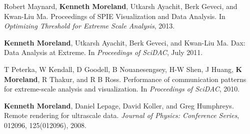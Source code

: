 \begin{enumerate}[label={[\arabic*]}, left=0pt]
\item  %
  Robert Maynard, \textbf{Kenneth Moreland}, Utkarsh Ayachit, Berk Geveci, and Kwan-Liu Ma.
  Proceedings of SPIE Visualization and Data Analysis.
  In \emph{Optimizing Threshold for Extreme Scale Analysis}, 2013.
\item  %
  \textbf{Kenneth Moreland}, Utkarsh Ayachit, Berk Geveci, and Kwan-Liu Ma.
  Dax: Data Analysis at Extreme.
  In \emph{Proceedings of SciDAC}, July 2011.
\item  %
  T Peterka, W Kendall, D Goodell, B Nouanesengsey, H-W Shen, J Huang, \textbf{K Moreland}, R Thakur, and R B Ross.
  Performance of communication patterns for extreme-scale analysis and visualization.
  In \emph{Proceedings of SciDAC}, 2010.
\item  %
  \textbf{Kenneth Moreland}, Daniel Lepage, David Koller, and Greg Humphreys.
  Remote rendering for ultrascale data.
  \emph{Journal of Physics: Conference Series}, 012096, 125(012096), 2008.
\end{enumerate}